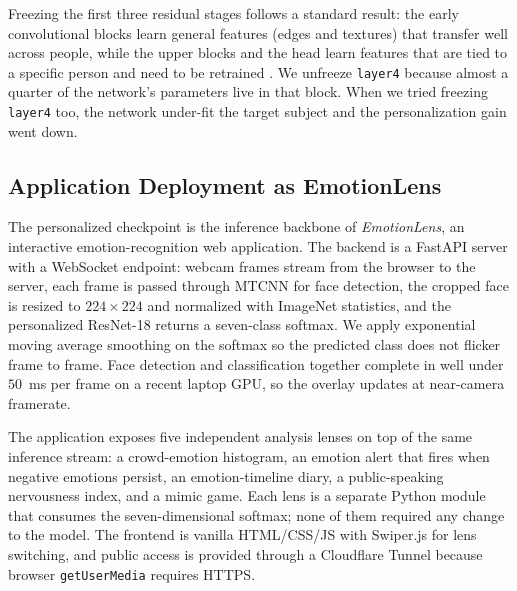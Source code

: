 Freezing the first three residual stages follows a standard result: the early convolutional blocks learn general features (edges and textures) that transfer well across people, while the upper blocks and the head learn features that are tied to a specific person and need to be retrained \autocite{ganin2015dann, finn2017maml}. We unfreeze \texttt{layer4} because almost a quarter of the network's parameters live in that block. When we tried freezing \texttt{layer4} too, the network under-fit the target subject and the personalization gain went down.

\subsection{Application Deployment as EmotionLens}
\label{sec:impl:deploy}

The personalized checkpoint is the inference backbone of \emph{EmotionLens}, an interactive emotion-recognition web application. The backend is a FastAPI server with a WebSocket endpoint: webcam frames stream from the browser to the server, each frame is passed through MTCNN \autocite{zhang2016mtcnn} for face detection, the cropped face is resized to $224 \times 224$ and normalized with ImageNet statistics, and the personalized ResNet-18 returns a seven-class softmax. We apply exponential moving average smoothing on the softmax so the predicted class does not flicker frame to frame. Face detection and classification together complete in well under $50$~ms per frame on a recent laptop GPU, so the overlay updates at near-camera framerate.

The application exposes five independent analysis lenses on top of the same inference stream: a crowd-emotion histogram, an emotion alert that fires when negative emotions persist, an emotion-timeline diary, a public-speaking nervousness index, and a mimic game. Each lens is a separate Python module that consumes the seven-dimensional softmax; none of them required any change to the model. The frontend is vanilla HTML/CSS/JS with Swiper.js for lens switching, and public access is provided through a Cloudflare Tunnel because browser \texttt{getUserMedia} requires HTTPS.

